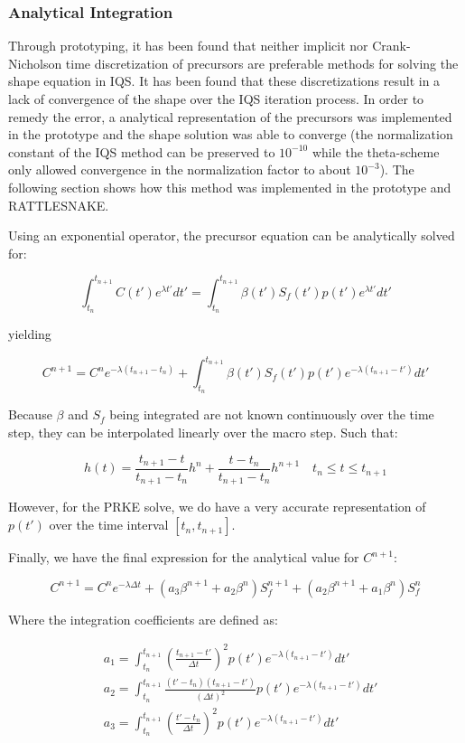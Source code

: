 \documentclass[12pt]{article}
\newcommand{\be}{\begin{equation}}
\newcommand{\ee}{\end{equation}}
\begin{document}
\subsubsection{Analytical Integration}

Through prototyping, it has been found that neither implicit nor Crank-Nicholson time discretization of precursors are preferable methods for solving the shape equation in IQS.  It has been found that these discretizations result in a lack of convergence of the shape over the IQS iteration process.  In order to remedy the error, a analytical representation of the precursors was implemented in the prototype and the shape solution was able to converge (the normalization constant of the IQS method can be preserved to $10^{-10}$ while the theta-scheme only allowed convergence in the normalization factor to about $10^{-3}$).  The following section shows how this method was implemented in the prototype and RATTLESNAKE.

Using an exponential operator, the precursor equation can be analytically solved for:

\be
\int_{t_n}^{t_{n+1}} C(t')e^{\lambda t'} dt' = \int_{t_n}^{t_{n+1}} \beta(t') S_f(t') p(t')e^{\lambda t'}dt'
\ee

yielding

\be
C^{n+1} =  C^n e^{-\lambda (t_{n+1} - t_n) }  + \int_{t_n}^{t_{n+1}} \beta(t') S_f(t') p(t')e^{-\lambda (t_{n+1}-t')}dt'
\ee

Because $\beta$ and $S_f$ being integrated are not known continuously over the time step, they can be interpolated linearly over the macro step.  Such that:

\be
h(t) = \frac{t_{n+1}-t}{t_{n+1}-t_n}h^n  + \frac{t-t_n}{t_{n+1}-t_n}h^{n+1}  \quad t_n \le t \le t_{n+1}
\ee

However, for the PRKE solve, we do have a very accurate representation of $p(t')$ over the time interval $[t_n,t_{n+1}]$.

Finally, we have the final expression for the analytical value for $C^{n+1}$:

\be
C^{n+1} = C^n e^{-\lambda \Delta t} 
+ \left(a_3\beta^{n+1}+a_2\beta^n\right)S_f^{n+1}
+ \left(a_2\beta^{n+1}+a_1\beta^n\right)S_f^n 
\ee

Where the integration coefficients are defined as:

\begin{align}
&a_1 = \int_{t_n}^{t_{n+1}}\left(\frac{t_{n+1}-t'}{\Delta t}\right)^2p(t')e^{-\lambda(t_{n+1}-t')}dt' \\
&a_2= \int_{t_n}^{t_{n+1}}\frac{(t'-t_n)(t_{n+1}-t')}{(\Delta t)^2}p(t')e^{-\lambda(t_{n+1}-t')}dt' \\
&a_3 = \int_{t_n}^{t_{n+1}}\left(\frac{t'-t_n}{\Delta t}\right)^2p(t')e^{-\lambda(t_{n+1}-t')}dt'
\end{align}
\end{document}
